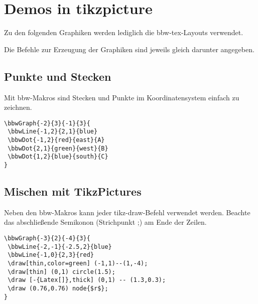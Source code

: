 


\renewcommand{\metaHeaderLine}{Einführung Trainer}
\renewcommand{\arbeitsblattTitel}{Demo Latex Beispiele zu Koordinatensystemen}

\arbeitsblattHeader{}

\section{Demos in tikzpicture}

Zu den folgenden Graphiken werden lediglich die bbw-tex-Layouts verwendet.

Die Befehle zur Erzeugung der Graphiken sind jeweils gleich darunter angegeben.

\subsection{Punkte und Stecken}
Mit bbw-Makros sind Stecken und Punkte im Koordinatensystem einfach zu zeichnen.


\begin{verbatim}
\bbwGraph{-2}{3}{-1}{3}{
 \bbwLine{-1,2}{2,1}{blue}
 \bbwDot{-1,2}{red}{east}{A}
 \bbwDot{2,1}{green}{west}{B}
 \bbwDot{1,2}{blue}{south}{C}
}
\end{verbatim}


\newpage
\subsection{Mischen mit TikzPictures}
Neben den bbw-Makros kann jeder tikz-draw-Befehl verwendet werden. Beachte das abschließende Semikonon (Strichpunkt ;) am Ende der Zeilen.

\begin{verbatim}
\bbwGraph{-3}{2}{-4}{3}{
 \bbwLine{-2,-1}{-2.5,2}{blue}
 \bbwLine{-1,0}{2,3}{red}
 \draw[thin,color=green] (-1,1)--(1,-4);
 \draw[thin] (0,1) circle(1.5);
 \draw [-{Latex[]},thick] (0,1) -- (1.3,0.3);
 \draw (0.76,0.76) node{$r$};
}
\end{verbatim}
\newpage

